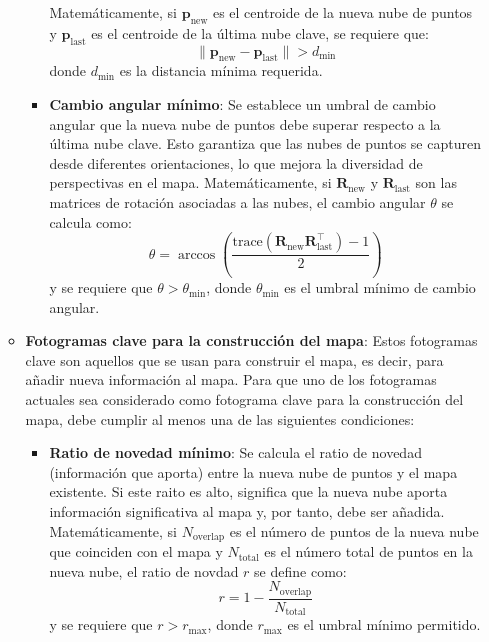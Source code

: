 \documentclass[12pt, a4paper, twoside]{article}
\begin{document}
\begin{itemize}
\begin{itemize}
\begin{itemize}
      Matemáticamente, si $\mathbf{p}_{\text{new}}$ es el centroide de la nueva nube de puntos y $\mathbf{p}_{\text{last}}$ es el centroide de la última nube clave, se requiere que:
      \[
      \|\mathbf{p}_{\text{new}} - \mathbf{p}_{\text{last}}\| > d_{\text{min}}
      \]
      donde $d_{\text{min}}$ es la distancia mínima requerida.
      \item \textbf{Cambio angular mínimo}: Se establece un umbral de cambio angular que la nueva nube de puntos debe superar respecto a la última nube clave. Esto garantiza que las 
      nubes de puntos se capturen desde diferentes orientaciones, lo que mejora la diversidad de perspectivas en el mapa.
      Matemáticamente, si $\mathbf{R}_{\text{new}}$ y $\mathbf{R}_{\text{last}}$ son las matrices de rotación asociadas a las nubes, el cambio angular $\theta$ se calcula como:
      \[
      \theta = \arccos\left(\frac{\text{trace}(\mathbf{R}_{\text{new}} \mathbf{R}_{\text{last}}^\top) - 1}{2}\right)
      \]
      y se requiere que $\theta > \theta_{\text{min}}$, donde $\theta_{\text{min}}$ es el umbral mínimo de cambio angular.
    \end{itemize}
    \item \textbf{Fotogramas clave para la construcción del mapa}: Estos fotogramas clave son aquellos que se usan para construir el mapa, es decir, para añadir nueva información
    al mapa. Para que uno de los fotogramas actuales sea considerado como fotograma clave para la construcción del mapa, debe cumplir al menos una de las siguientes condiciones:
    \begin{itemize}
      \item \textbf{Ratio de novedad mínimo}: Se calcula el ratio de novedad (información que aporta) entre la nueva nube de puntos y el mapa existente. Si este raito es alto, 
      significa que la nueva nube aporta información significativa al mapa y, por tanto, debe ser añadida.
      Matemáticamente, si $N_{\text{overlap}}$ es el número de puntos de la nueva nube que coinciden con el mapa y $N_{\text{total}}$ es el número total de puntos en la nueva nube, el ratio de novdad $r$ se define como:
      \[
      r = 1-\frac{N_{\text{overlap}}}{N_{\text{total}}}
      \]
      y se requiere que $r > r_{\text{max}}$, donde $r_{\text{max}}$ es el umbral mínimo permitido.
    \end{itemize}
  \end{itemize}
\end{itemize}
\end{document}
